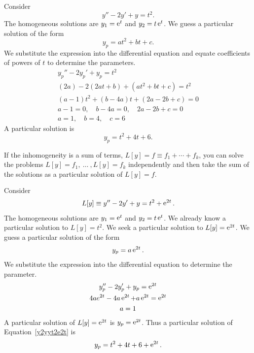 \begin{Example}
  Consider
  \[
  y'' - 2 y' + y = t^2.
  \]
  The homogeneous solutions are $y_1 = \mathop{\mathrm{e}}\nolimits^t$ and $y_2 = t \mathop{\mathrm{e}}\nolimits^t$.
  We guess a particular solution of the form
  \[
  y_p = a t^2 + b t + c.
  \]
  We substitute the expression into the differential equation 
  and equate coefficients of powers of $t$ to determine the parameters.
  \begin{gather*}
    y_p'' - 2 y_p' + y_p = t^2 \\
    (2 a) - 2 (2 a t + b) + (a t^2 + b t + c) = t^2 \\
    (a - 1) t^2 + (b - 4 a) t + (2 a - 2 b + c) = 0 \\
    a - 1 = 0, \quad b - 4 a = 0, \quad 2 a - 2 b + c = 0 \\
    a = 1, \quad b = 4, \quad c = 6
  \end{gather*}
  A particular solution is
  \[
  y_p = t^2 + 4 t + 6.
  \]
\end{Example}




If the inhomogeneity is a sum of terms, $L[y] = f \equiv f_1 + \cdots + f_k$,
you can solve the problems $L[y] = f_1,\ \ldots \ ,L[y] = f_k$ independently 
and then take the sum of the solutions as a particular solution of
$L[y] = f$.



\begin{Example}
  Consider
  \begin{equation}
    \label{y2yyt2e2t}
    L[y] \equiv y'' - 2 y' + y = t^2 + \mathop{\mathrm{e}}\nolimits^{2 t}.
  \end{equation}
  The homogeneous solutions are $y_1 = \mathop{\mathrm{e}}\nolimits^t$ and $y_2 = t \mathop{\mathrm{e}}\nolimits^t$.
  We already know a particular solution to $L[y] = t^2$.  
  We seek a particular solution to $L[y] = \mathop{\mathrm{e}}\nolimits^{2 t}$.
  We guess a particular solution of the form
  \[
  y_p = a \mathop{\mathrm{e}}\nolimits^{2 t}.
  \]
  We substitute the expression into the differential equation 
  to determine the parameter.
  \begin{gather*}
    y_p'' - 2 y_p' + y_p = \mathop{\mathrm{e}}\nolimits^{2 t} \\
    4 a e^{2 t} - 4 a \mathop{\mathrm{e}}\nolimits^{2 t} + a \mathop{\mathrm{e}}\nolimits^{2 t} = \mathop{\mathrm{e}}\nolimits^{2 t} \\
    a = 1
  \end{gather*}
  A particular solution of $L[y] = \mathop{\mathrm{e}}\nolimits^{2 t}$ is $y_p = \mathop{\mathrm{e}}\nolimits^{2 t}$.
  Thus a particular solution of Equation~\ref{y2yyt2e2t} is
  \[
  y_p = t^2 + 4 t + 6 + \mathop{\mathrm{e}}\nolimits^{2 t}.
  \]
\end{Example}




